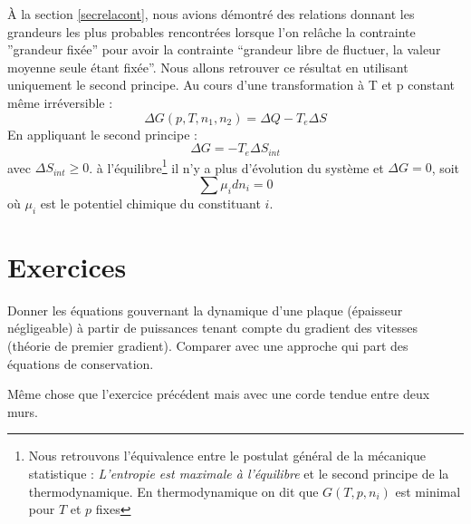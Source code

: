 \documentclass[12pt]{book}
\begin{document}
\begin{exmp}
\`A la section \ref{secrelacont}, nous avions d\'emontr\'e des
relations donnant les grandeurs les plus probables rencontr\'ees lorsque
l'on rel\^ache la contrainte ''grandeur fix\'ee'' pour avoir la
contrainte ``grandeur libre de fluctuer, la valeur moyenne seule
\'etant fix\'ee''.
Nous allons retrouver ce r\'esultat en utilisant uniquement le second
principe. 
Au cours d'une transformation \`a T et p constant m\^eme irr\'eversible :
\begin{equation}
\Delta G(p,T,n_1,n_2)=\Delta Q -T_e\Delta S
\end{equation}
En appliquant le second principe :
\begin{equation}
\Delta G=-T_e\Delta S_{int}
\end{equation}
avec $\Delta S_{int}\geq 0$. \`a l'\'equilibre\footnote{%
Nous retrouvons l'\'equivalence entre le postulat g\'en\'eral de la
m\'ecanique 
statistique :
\medskip
{\it L'entropie est maximale \`a l'\'equilibre}
\medskip
et le second principe de la thermodynamique. En thermodynamique on dit
que $G(T,p,n_i)$ est minimal pour $T$ et $p$ fixes}%
 il n'y a plus d'\'evolution du
syst\`eme et $\Delta G=0$, soit
\begin{equation}
\sum\mu_i dn_i=0
\end{equation}
o\`u $\mu_i$ est le potentiel chimique du constituant $i$. 
\end{exmp}


\section{Exercices}
\begin{exo}
Donner les \'equations gouvernant la dynamique d'une plaque (\'epaisseur
n\'egligeable) \`a partir de puissances tenant compte du gradient des vitesses
(th\'eorie de premier gradient). Comparer avec une approche qui part des
\'equations de conservation.
\end{exo}

\begin{exo}
M\^eme chose que l'exercice pr\'ec\'edent mais avec une corde tendue entre
deux murs.
\end{exo}
\end{document}

